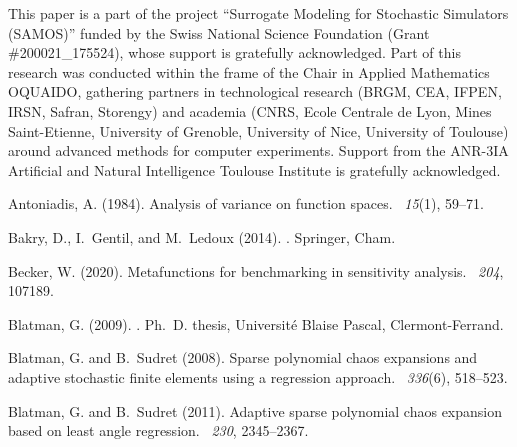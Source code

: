 \documentclass[a4paper,11pt]{article}
\theoremstyle{definition}
\theoremstyle{remark}
\theoremstyle{theorem}
\begin{document}
This paper is a part of the project ``Surrogate Modeling for Stochastic Simulators (SAMOS)'' funded by the Swiss National Science Foundation (Grant \#200021\_175524), whose support is gratefully acknowledged.
Part of this research was conducted within the frame of the Chair in Applied Mathematics OQUAIDO, gathering partners in technological research (BRGM, CEA, IFPEN, IRSN, Safran, Storengy) and academia (CNRS, Ecole Centrale de Lyon, Mines Saint-Etienne, University of Grenoble, University of Nice, University of Toulouse) around advanced methods for computer experiments. Support from the ANR-3IA Artificial and Natural Intelligence Toulouse Institute is gratefully acknowledged.



%
\begin{thebibliography}{}
	
	Antoniadis, A. (1984).
	\newblock Analysis of variance on function spaces.
	~{\em 15\/}(1), 59--71.
	
	Bakry, D., I.~Gentil, and M.~Ledoux (2014).
	.
	\newblock Springer, Cham.
	
	Becker, W. (2020).
	\newblock Metafunctions for benchmarking in sensitivity analysis.
	~{\em 204}, 107189.
	
	Blatman, G. (2009).
	.
	\newblock Ph.\ D. thesis, Universit\'e Blaise Pascal, Clermont-Ferrand.
	
	Blatman, G. and B.~Sudret (2008).
	\newblock Sparse polynomial chaos expansions and adaptive stochastic finite
	elements using a regression approach.
	~{\em 336\/}(6), 518--523.
	
	Blatman, G. and B.~Sudret (2011).
	\newblock Adaptive sparse polynomial chaos expansion based on least angle
	regression.
	~{\em 230}, 2345--2367.
	

\end{thebibliography}
\end{document}
